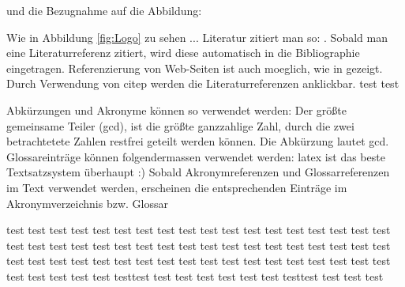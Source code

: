 und die Bezugnahme auf die Abbildung:

Wie in Abbildung \ref{fig:Logo} zu sehen ...
Literatur zitiert man so: \citep{friese_handbuch_2020}. Sobald man eine Literaturreferenz zitiert, 
wird diese automatisch
in die Bibliographie eingetragen. Referenzierung von Web-Seiten ist auch moeglich, wie in \citep{oneclickVDIUnd2019} gezeigt. 
Durch Verwendung von citep werden die Literaturreferenzen anklickbar.
test test

\newpage 

Abkürzungen und Akronyme können so verwendet werden: Der größte gemeinsame Teiler (\acrlong{gcd}), ist die größte ganzzahlige Zahl, durch die
zwei betrachtetete Zahlen restfrei geteilt werden können.
Die Abkürzung lautet \acrshort{gcd}.\\
Glossareinträge können folgendermassen verwendet werden:  \Gls{latex} ist das beste Textsatzsystem überhaupt :) 
Sobald Akronymreferenzen und Glossarreferenzen im Text verwendet werden, erscheinen die entsprechenden Einträge im Akronymverzeichnis bzw. Glossar

test test test test test test test test test test test test test test test test test test test test test test test test test test test test test test test test test test test test test test test test test test test test test test test test test test test test test test test test test test test testtest test test test test test test testtest test test test


